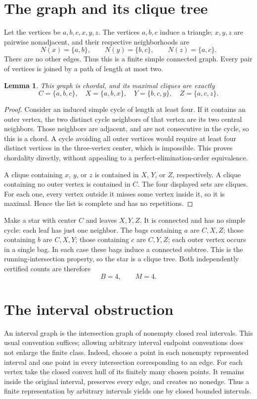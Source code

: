 \documentclass[11pt]{article}
\newtheorem{lemma}{Lemma}
\begin{document}
\section{The graph and its clique tree}
Let the vertices be $a,b,c,x,y,z$. The vertices $a,b,c$ induce a triangle; $x,y,z$ are pairwise nonadjacent, and their respective neighborhoods are
\[
N(x)=\{a,b\},\qquad N(y)=\{b,c\},\qquad N(z)=\{a,c\}.
\]
There are no other edges. Thus this is a finite simple connected graph. Every pair of vertices is joined by a path of length at most two.
\begin{lemma}
This graph is chordal, and its maximal cliques are exactly
\[
C=\{a,b,c\},\quad X=\{a,b,x\},\quad Y=\{b,c,y\},\quad Z=\{a,c,z\}.
\]
\end{lemma}
\begin{proof}
Consider an induced simple cycle of length at least four. If it contains an outer vertex, the two distinct cycle neighbors of that vertex are its two central neighbors. Those neighbors are adjacent, and are not consecutive in the cycle, so this is a chord. A cycle avoiding all outer vertices would require at least four distinct vertices in the three-vertex center, which is impossible. This proves chordality directly, without appealing to a perfect-elimination-order equivalence.

A clique containing $x$, $y$, or $z$ is contained in $X$, $Y$, or $Z$, respectively. A clique containing no outer vertex is contained in $C$. The four displayed sets are cliques. For each one, every vertex outside it misses some vertex inside it, so it is maximal. Hence the list is complete and has no repetitions.
\end{proof}
Make a star with center $C$ and leaves $X,Y,Z$. It is connected and has no simple cycle: each leaf has just one neighbor. The bags containing $a$ are $C,X,Z$; those containing $b$ are $C,X,Y$; those containing $c$ are $C,Y,Z$; each outer vertex occurs in a single bag. In each case these bags induce a connected subtree. This is the running-intersection property, so the star is a clique tree. Both independently certified counts are therefore
\begin{equation}\label{counts} B=4,\qquad M=4.\end{equation}
\section{The interval obstruction}
An interval graph is the intersection graph of nonempty closed real intervals. This usual convention suffices; allowing arbitrary interval endpoint conventions does not enlarge the finite class. Indeed, choose a point in each nonempty represented interval and one point in every intersection corresponding to an edge. For each vertex take the closed convex hull of its finitely many chosen points. It remains inside the original interval, preserves every edge, and creates no nonedge. Thus a finite representation by arbitrary intervals yields one by closed bounded intervals.
\end{document}
